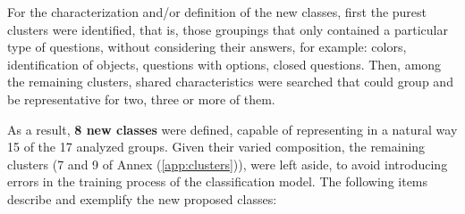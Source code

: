 For the characterization and/or definition of the new classes, first the purest clusters were identified, that is, those groupings that only contained a particular type of questions, without considering their answers, for example: colors, identification of objects, questions with options, closed questions. Then, among the remaining clusters, shared characteristics were searched that could group and be representative for two, three or more of them.

As a result, \textbf{8 new classes} were defined, capable of representing in a natural way 15 of the 17 analyzed groups. Given their varied composition, the remaining clusters (7 and 9 of Annex (\ref{app:clusters})), were left aside, to avoid introducing errors in the training process of the classification model. The following items describe and exemplify the new proposed classes:

